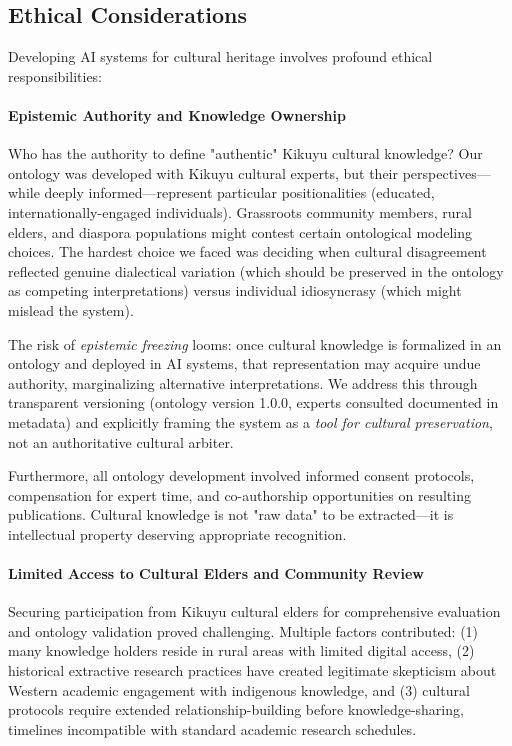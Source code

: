\subsection{Ethical Considerations}
\label{subsec:ethical_considerations}

Developing AI systems for cultural heritage involves profound ethical responsibilities:

\paragraph{Epistemic Authority and Knowledge Ownership}

Who has the authority to define "authentic" Kikuyu cultural knowledge? Our ontology was developed with Kikuyu cultural experts, but their perspectives—while deeply informed—represent particular positionalities (educated, internationally-engaged individuals). Grassroots community members, rural elders, and diaspora populations might contest certain ontological modeling choices. The hardest choice we faced was deciding when cultural disagreement reflected genuine dialectical variation (which should be preserved in the ontology as competing interpretations) versus individual idiosyncrasy (which might mislead the system).

The risk of \emph{epistemic freezing} looms: once cultural knowledge is formalized in an ontology and deployed in AI systems, that representation may acquire undue authority, marginalizing alternative interpretations. We address this through transparent versioning (ontology version 1.0.0, experts consulted documented in metadata) and explicitly framing the system as a \emph{tool for cultural preservation}, not an authoritative cultural arbiter.

Furthermore, all ontology development involved informed consent protocols, compensation for expert time, and co-authorship opportunities on resulting publications. Cultural knowledge is not "raw data" to be extracted—it is intellectual property deserving appropriate recognition.

\paragraph{Limited Access to Cultural Elders and Community Review}

Securing participation from Kikuyu cultural elders for comprehensive evaluation and ontology validation proved challenging. Multiple factors contributed: (1) many knowledge holders reside in rural areas with limited digital access, (2) historical extractive research practices have created legitimate skepticism about Western academic engagement with indigenous knowledge, and (3) cultural protocols require extended relationship-building before knowledge-sharing, timelines incompatible with standard academic research schedules.

